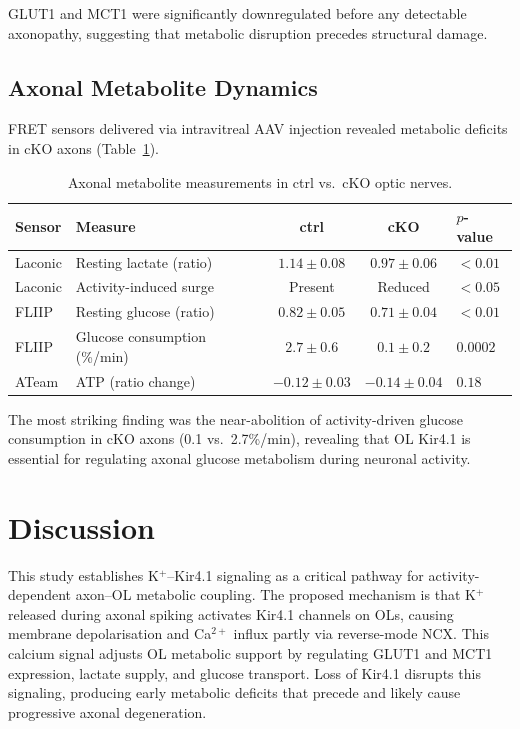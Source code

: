 \documentclass[11pt]{article}
\begin{document}
GLUT1 and MCT1 were significantly downregulated before any detectable axonopathy, suggesting that metabolic disruption precedes structural damage.

\subsection{Axonal Metabolite Dynamics}

FRET sensors delivered via intravitreal AAV injection revealed metabolic deficits in cKO axons (Table~\ref{tab:metabolites}).

\begin{table}[H]
\centering
\caption{Axonal metabolite measurements in ctrl vs.\ cKO optic nerves.}
\label{tab:metabolites}
\begin{tabular}{@{}llccl@{}}
\toprule
Sensor & Measure & ctrl & cKO & $p$-value \\
\midrule
Laconic & Resting lactate (ratio) & $1.14 \pm 0.08$ & $0.97 \pm 0.06$ & $\mathbf{< 0.01}$ \\
Laconic & Activity-induced surge & Present & Reduced & $\mathbf{< 0.05}$ \\
FLIIP & Resting glucose (ratio) & $0.82 \pm 0.05$ & $0.71 \pm 0.04$ & $\mathbf{< 0.01}$ \\
FLIIP & Glucose consumption (\%/min) & $2.7 \pm 0.6$ & $0.1 \pm 0.2$ & $\mathbf{0.0002}$ \\
ATeam & ATP (ratio change) & $-0.12 \pm 0.03$ & $-0.14 \pm 0.04$ & $0.18$ \\
\bottomrule
\end{tabular}
\end{table}

The most striking finding was the near-abolition of activity-driven glucose consumption in cKO axons (0.1 vs.\ 2.7\%/min), revealing that OL Kir4.1 is essential for regulating axonal glucose metabolism during neuronal activity.

\section{Discussion}

This study establishes K$^+$--Kir4.1 signaling as a critical pathway for activity-dependent axon--OL metabolic coupling. The proposed mechanism is that K$^+$ released during axonal spiking activates Kir4.1 channels on OLs, causing membrane depolarisation and Ca$^{2+}$ influx partly via reverse-mode NCX. This calcium signal adjusts OL metabolic support by regulating GLUT1 and MCT1 expression, lactate supply, and glucose transport. Loss of Kir4.1 disrupts this signaling, producing early metabolic deficits that precede and likely cause progressive axonal degeneration.
\end{document}
